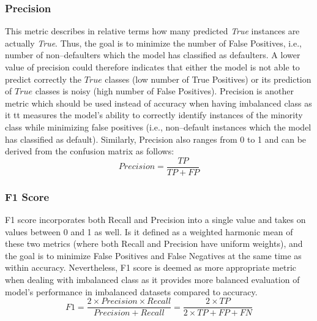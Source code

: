 \subsubsection{Precision}
This metric describes in relative terms how many predicted \textit{True} instances are actually \textit{True}. Thus, the goal is to minimize the number of False Positives, i.e., number of non--defaulters which the model has classified as defaulters.
A lower value of precision could therefore indicates that either the model is not able to predict correctly the $True$ classes (low number of True Positives) or its prediction of $True$ classes is noisy (high number of False Positives).
Precision is another metric which should be used instead of accuracy when having imbalanced class as it tt measures the model's ability to correctly identify instances of the minority class while minimizing false positives (i.e., non--default instances which the model has classified as default).
Similarly, Precision also ranges from 0 to 1 and can be derived from the confusion matrix as follows:
\begin{equation}\label{eq}
    Precision = \frac{TP}{TP + FP}
\end{equation}
\subsubsection{F1 Score}
F1 score incorporates both Recall and Precision into a single value and takes on values between 0 and 1 as well.
Is it defined as a weighted harmonic mean of these two metrics \citep{brabec2020model} (where both Recall and Precision have uniform weights), and the goal is to minimize False Positives and False Negatives at the same time as within accuracy.
Nevertheless, F1 score is deemed as more appropriate metric when dealing with imbalanced class as it provides more balanced evaluation of model's performance in imbalanced datasets compared to accuracy.
\begin{equation}\label{eq}
    F1 = \frac{2 \times Precision \times Recall}{Precision + Recall} = \frac{2 \times TP}{2 \times TP + FP + FN}
\end{equation}

